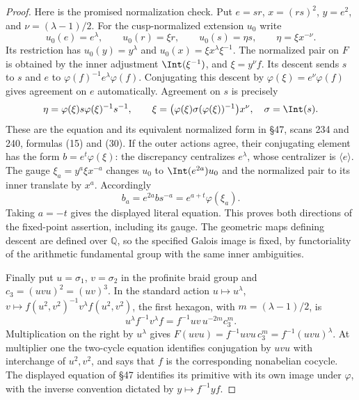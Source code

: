 \begin{proof}
Here is the promised normalization check. Put $e=sr$,
$x=(rs)^2$, $y=e^2$, and $\nu=(\lambda-1)/2$. For the cusp-normalized
extension $u_0$ write
\[
 u_0(e)=e^\lambda,\qquad u_0(r)=\xi r,\qquad
 u_0(s)=\eta s,\qquad \eta=\xi x^{-\nu}.
\]
Its restriction has $u_0(y)=y^\lambda$ and
$u_0(x)=\xi x^\lambda\xi^{-1}$. The normalized pair on $F$ is
obtained by the inner adjustment $\Int(\xi^{-1})$, and
$\xi=y^\nu f$. Its descent sends $s$ to $s$ and $e$ to
$\varphi(f)^{-1}e^\lambda\varphi(f)$. Conjugating this descent by
$\varphi(\xi)=e^\nu\varphi(f)$ gives agreement on $e$ automatically.
Agreement on $s$ is precisely
\[
 \eta=\varphi(\xi)s\varphi(\xi)^{-1}s^{-1},\qquad
 \xi=\bigl(\varphi(\xi)\sigma(\varphi(\xi))^{-1}\bigr)x^\nu,
 \quad \sigma=\Int(s).
\]
These are the equation and its equivalent normalized form in
\S47, scans 234 and 240, formulas (15) and (30).
If the outer actions agree, their conjugating element has the form
$b=e^t\varphi(\xi)$: the discrepancy centralizes $e^\lambda$, whose
centralizer is $\langle e\rangle$. The gauge
$\xi_a=y^a\xi x^{-a}$ changes $u_0$ to $\Int(e^{2a})u_0$
and the normalized pair to its inner translate by $x^a$.
Accordingly
\[
 b_a=e^{2a}bs^{-a}=e^{a+t}\varphi(\xi_a).
\]
Taking $a=-t$ gives the displayed literal equation. This proves
both directions of the fixed-point assertion, including its gauge.
The geometric maps defining descent are defined over $\mathbb Q$,
so the specified Galois image is fixed, by functoriality of the
arithmetic fundamental group with the same inner ambiguities.

Finally put $u=\sigma_1$, $v=\sigma_2$ in the profinite braid group
and $c_3=(uvu)^2=(uv)^3$. In the standard action
$u\mapsto u^\lambda$, $v\mapsto f(u^2,v^2)^{-1}v^\lambda f(u^2,v^2)$,
the first hexagon, with $m=(\lambda-1)/2$, is
\[
 u^\lambda f^{-1}v^\lambda f
       =f^{-1}uv\,u^{-2m}c_3^m.
\]
Multiplication on the right by $u^\lambda$ gives
$F(uvu)=f^{-1}uvu\,c_3^m=f^{-1}(uvu)^\lambda$.
At multiplier one the two-cycle equation identifies conjugation
by $uvu$ with interchange of $u^2,v^2$, and says that $f$ is the
corresponding nonabelian cocycle. The displayed equation of
\S47 identifies its primitive with its own image under $\varphi$,
with the inverse convention dictated by $y\mapsto f^{-1}yf$.
\end{proof}

